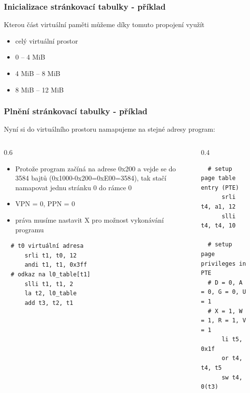 \documentclass[aspectratio=169]{beamer}
\begin{document}
\begin{frame}
\frametitle{Inicializace stránkovací tabulky - příklad}

Kterou část virtuální paměti můžeme díky tomuto propojení využít
\begin{itemize}
 \item[A] celý virtuální prostor
 \item[B] 0 -- 4 MiB
 \item[C] 4 MiB -- 8 MiB
 \item[D] 8 MiB -- 12 MiB
\end{itemize}
\end{frame}


\begin{frame}[fragile]
\frametitle{Plnění stránkovací tabulky - příklad}

Nyní si do virtuálního prostoru namapujeme na stejné adresy program:
\begin{columns}[t]
\begin{column}{0.6\textwidth}
\begin{itemize}
\item Protože program začíná na adrese 0x200 a vejde se do 3584 bajtů (0x1000-0x200=0xE00=3584), tak stačí namapovat jednu stránku 0 do rámce 0
\item VPN = 0, PPN = 0
\item práva musíme nastavit X pro možnost vykonávání programu
\end{itemize}

\begin{verbatim}
  # t0 virtuální adresa
      srli t1, t0, 12
      andi t1, t1, 0x3ff
  # odkaz na l0_table[t1]
      slli t1, t1, 2
      la t2, l0_table
      add t3, t2, t1
\end{verbatim}
\end{column}
\hfill
\begin{column}{0.4\textwidth}

\begin{verbatim}
  # setup page table entry (PTE)
      srli t4, a1, 12
      slli t4, t4, 10

  # setup page privileges in PTE
  # D = 0, A = 0, G = 0, U = 1
  # X = 1, W = 1, R = 1, V = 1
      li t5, 0x1f
      or t4, t4, t5
      sw t4, 0(t3)
\end{verbatim}

\end{column}
\end{columns}

\end{frame}
\end{document}
